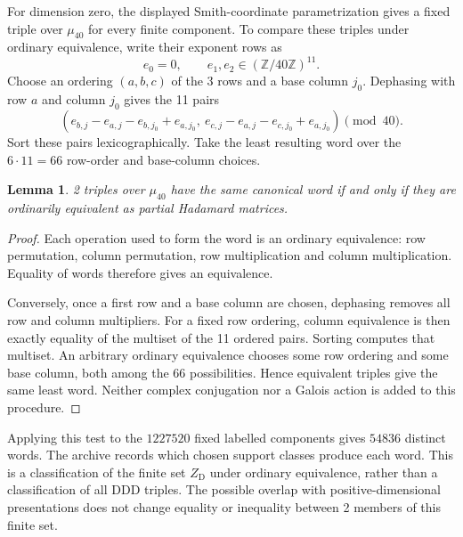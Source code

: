 \documentclass[11pt,a4paper]{article}
\newtheorem{lemma}[theorem]{Lemma}
\theoremstyle{plain}
\theoremstyle{definition}
\theoremstyle{plain}
\begin{document}
\medskip
For dimension zero, the displayed Smith-coordinate parametrization gives a fixed triple over $\mu_{40}$ for every finite component. To compare these triples under ordinary equivalence, write their exponent rows as
$$e_0=0,\qquad e_1,e_2\in(\mathbb Z/40\mathbb Z)^{11}.$$
Choose an ordering $(a,b,c)$ of the 3 rows and a base column $j_0$. Dephasing with row $a$ and column $j_0$ gives the 11 pairs
\[
\left(
 e_{b,j}-e_{a,j}-e_{b,j_0}+e_{a,j_0},\
 e_{c,j}-e_{a,j}-e_{c,j_0}+e_{a,j_0}
\right)\pmod {40}.
\]
Sort these pairs lexicographically. Take the least resulting word over the $6\cdot11=66$ row-order and base-column choices.

\par\addvspace{\medskipamount}\noindent
\begin{minipage}{\linewidth}
\begin{lemma}\label{n11_fourth:equivalence}
2 triples over $\mu_{40}$ have the same canonical word if and only if they are ordinarily equivalent as partial Hadamard matrices.
\end{lemma}
\end{minipage}
\par\addvspace{\medskipamount}

\begin{proof}
Each operation used to form the word is an ordinary equivalence: row permutation, column permutation, row multiplication and column multiplication. Equality of words therefore gives an equivalence.

Conversely, once a first row and a base column are chosen, dephasing removes all row and column multipliers. For a fixed row ordering, column equivalence is then exactly equality of the multiset of the 11 ordered pairs. Sorting computes that multiset. An arbitrary ordinary equivalence chooses some row ordering and some base column, both among the $66$ possibilities. Hence equivalent triples give the same least word. Neither complex conjugation nor a Galois action is added to this procedure.
\end{proof}

Applying this test to the $1227520$ fixed labelled components gives $54836$ distinct words. The archive records which chosen support classes produce each word. This is a classification of the finite set $Z_{\mathrm D}$ under ordinary equivalence, rather than a classification of all $\mathrm{DDD}$ triples. The possible overlap with positive-dimensional presentations does not change equality or inequality between 2 members of this finite set.
\end{document}
